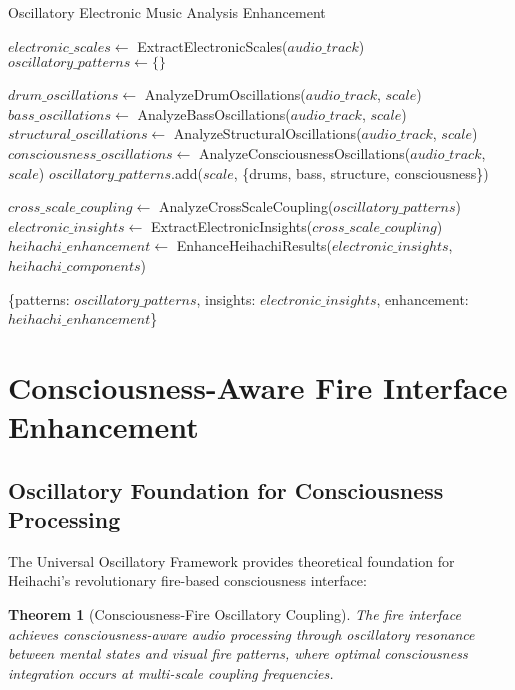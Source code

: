 \documentclass[12pt,a4paper]{article}
\newtheorem{theorem}{Theorem}
\begin{document}
\begin{algorithm}
\caption{Oscillatory Electronic Music Analysis Enhancement}
\begin{algorithmic}[1]
    \State $electronic\_scales \gets$ ExtractElectronicScales($audio\_track$)
    \State $oscillatory\_patterns \gets \{\}$
    
        \State $drum\_oscillations \gets$ AnalyzeDrumOscillations($audio\_track$, $scale$)
        \State $bass\_oscillations \gets$ AnalyzeBassOscillations($audio\_track$, $scale$)
        \State $structural\_oscillations \gets$ AnalyzeStructuralOscillations($audio\_track$, $scale$)
        \State $consciousness\_oscillations \gets$ AnalyzeConsciousnessOscillations($audio\_track$, $scale$)
        \State $oscillatory\_patterns$.add($scale$, \{drums, bass, structure, consciousness\})
    \EndFor
    
    \State $cross\_scale\_coupling \gets$ AnalyzeCrossScaleCoupling($oscillatory\_patterns$)
    \State $electronic\_insights \gets$ ExtractElectronicInsights($cross\_scale\_coupling$)
    \State $heihachi\_enhancement \gets$ EnhanceHeihachiResults($electronic\_insights$, $heihachi\_components$)
    
    \State \Return \{patterns: $oscillatory\_patterns$, insights: $electronic\_insights$, enhancement: $heihachi\_enhancement$\}
\EndProcedure
\end{algorithmic}
\end{algorithm}

\section{Consciousness-Aware Fire Interface Enhancement}

\subsection{Oscillatory Foundation for Consciousness Processing}

The Universal Oscillatory Framework provides theoretical foundation for Heihachi's revolutionary fire-based consciousness interface:

\begin{theorem}[Consciousness-Fire Oscillatory Coupling]
The fire interface achieves consciousness-aware audio processing through oscillatory resonance between mental states and visual fire patterns, where optimal consciousness integration occurs at multi-scale coupling frequencies.
\end{theorem}
\end{document}
